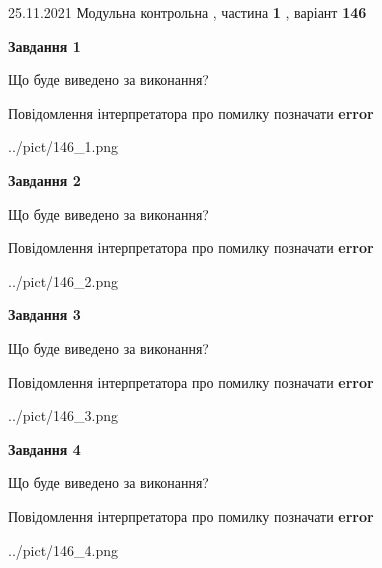 \documentclass[10pt, ukrainian]{article}
\begin{document}
{25.11.2021 Модульна контрольна , частина \textbf { 1 }, варіант  \No \textbf { 146 }\par}
{
\begin {large}

{\begin {center}\textbf{Завдання 1}\end {center}}\par
Що буде виведено за виконання? \par
Повідомлення інтерпретатора про помилку позначати \textbf{error}

\begin{center}
	{../pict/146_1.png}
\end{center}
\newpage

{\begin {center}\textbf{Завдання 2}\end {center}}\par
Що буде виведено за виконання? \par
Повідомлення інтерпретатора про помилку позначати \textbf{error}

\begin{center}
	{../pict/146_2.png}
\end{center}
\newpage

{\begin {center}\textbf{Завдання 3}\end {center}}\par
Що буде виведено за виконання? \par
Повідомлення інтерпретатора про помилку позначати \textbf{error}

\begin{center}
	{../pict/146_3.png}
\end{center}
\newpage

{\begin {center}\textbf{Завдання 4}\end {center}}\par
Що буде виведено за виконання? \par
Повідомлення інтерпретатора про помилку позначати \textbf{error}

\begin{center}
	{../pict/146_4.png}
\end{center}
\newpage


\end{large}}
\end{document}
